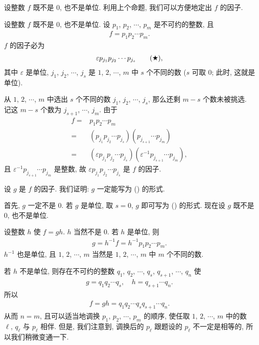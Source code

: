 设整数 $f$ 既不是 $0$, 也不是单位. 利用上个命题, 我们可以方便地定出 $f$ 的因子.

\begin{proposition}
    设整数 $f$ 既不是 $0$, 也不是单位. 设 $p_1$, $p_2$, $\cdots$, $p_m$ 是不可约的整数, 且
    \begin{align*}
        f = p_1 p_2 \cdots p_m.
    \end{align*}
    $f$ 的因子必为
    \begin{align*}
        \varepsilon p_{j_1} p_{j_2} \cdots p_{j_s} \tag*{(\ding{72})},
    \end{align*}
    其中 $\varepsilon$ 是单位, $j_1$, $j_2$, $\cdots$, $j_s$ 是 $1$, $2$, $\cdots$, $m$ 中 $s$ 个不同的数 ($s$ 可取 $0$; 此时, 这就是单位).
\end{proposition}

\begin{pf}
    从 $1$, $2$, $\cdots$, $m$ 中选出 $s$ 个不同的数 $j_1$, $j_2$, $\cdots$, $j_s$, 那么还剩 $m-s$ 个数未被挑选. 记这 $m-s$ 个数为 $j_{s+1}$, $\cdots$, $j_m$. 由于
    \begin{align*}
        f
        = {} & p_1 p_2 \cdots p_m                                                                          \\
        = {} & (p_{j_1} p_{j_2} \cdots p_{j_s}) (p_{j_{s+1}} \cdots p_{j_m})                               \\
        = {} & (\varepsilon p_{j_1} p_{j_2} \cdots p_{j_s}) (\varepsilon^{-1} p_{j_{s+1}} \cdots p_{j_m}),
    \end{align*}
    且 $\varepsilon^{-1} p_{j_{s+1}} \cdots p_{j_m}$ 是整数, 故 $\varepsilon p_{j_1} p_{j_2} \cdots p_{j_s}$ 是 $f$ 的因子.

    设 $g$ 是 $f$ 的因子. 我们证明: $g$ 一定能写为 () 的形式.

    首先, $g$ 一定不是 $0$. 若 $g$ 是单位, 取 $s = 0$, $g$ 即可写为 () 的形式. 现在设 $g$ 既不是 $0$, 也不是单位.

    设整数 $h$ 使 $f = gh$. $h$ 当然不是 $0$. 若 $h$ 是单位, 则
    \begin{align*}
        g = h^{-1} f = h^{-1} p_1 p_2 \cdots p_m.
    \end{align*}
    $h^{-1}$ 也是单位, 且 $1$, $2$, $\cdots$, $m$ 当然是 $1$, $2$, $\cdots$, $m$ 中 $m$ 个不同的数.

    若 $h$ 不是单位, 则存在不可约的整数 $q_1$, $q_2$, $\cdots$, $q_s$, $q_{s+1}$, $\cdots$, $q_n$ 使
    \begin{align*}
        g = q_1 q_2 \cdots q_s, \quad h = q_{s+1} \cdots q_n.
    \end{align*}
    所以
    \begin{align*}
        f = gh = q_1 q_2 \cdots q_s q_{s+1} \cdots q_n.
    \end{align*}
    从而 $n = m$, 且可以适当地调换 $p_1$, $p_2$, $\cdots$, $p_m$ 的顺序, 使任取 $1$, $2$, $\cdots$, $m$ 中的数 $\ell$, $q_\ell$ 与 $p_\ell$ 相伴. 但是, 我们注意到, 调换后的 $p_{\ell}$ 跟题设的 $p_{\ell}$ 不一定是相等的, 所以我们稍微变通一下.


\end{pf}
